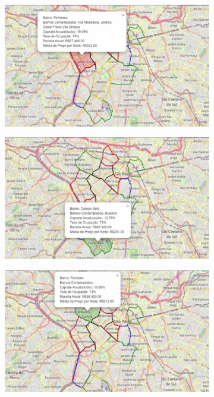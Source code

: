 \begin{figure}
    \begin{subfigure}{0.49\linewidth}
        \includegraphics[width = \textwidth]{relatorios/lounge/imagens/1.jpg}
    \end{subfigure}
    \hfill
    \begin{subfigure}{0.49\linewidth}
        \includegraphics[width = \textwidth]{relatorios/lounge/imagens/2.jpg}
    \end{subfigure}
    \begin{subfigure}{0.49\linewidth}
        \includegraphics[width = \textwidth]{relatorios/lounge/imagens/3.jpg}

\end{subfigure}
\end{figure}
